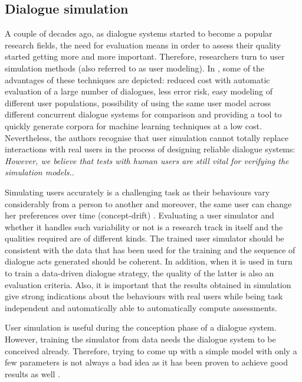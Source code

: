     \subsection{Dialogue simulation}
    
    	A couple of decades ago, as dialogue systems started to become a popular research fields, the need for evaluation means in order to assess their quality started getting more and more important. Therefore, researchers turn to user simulation methods (also referred to as user modeling). In \cite{Eckert1997}, some of the advantages of these techniques are depicted: reduced cost with automatic evaluation of a large number of dialogues, less error risk, easy modeling of different user populations, possibility of using the same user model across different concurrent dialogue systems for comparison and providing a tool to quickly generate corpora for machine learning techniques at a low cost. Nevertheless, the authors recognise that user simulation cannot totally replace interactions with real users in the process of designing reliable dialogue systems: \textit{However, we believe that tests with human users are still vital for verifying the simulation models.}.
        
       	Simulating users accurately is a challenging task as their behaviours vary considerably from a person to another and moreover, the same user can change her preferences over time (concept-drift) \cite{Schatzmann2006}. Evaluating a user simulator and whether it handles such variability or not is a research track in itself \cite{Pietquin2013} and the qualities required are of different kinds. The trained user simulator should be consistent with the data that has been used for the training and the sequence of dialogue acts generated should be coherent. In addition, when it is used in turn to train a data-driven dialogue strategy, the quality of the latter is also an evaluation criteria. Also, it is important that the results obtained in simulation give strong indications about the behaviours with real users while being task independent and automatically able to automatically compute assessments.
        
        User simulation is useful during the conception phase of a dialogue system. However, training the simulator from data needs the dialogue system to be conceived already. Therefore, trying to come up with a simple model with only a few parameters is not always a bad idea as it has been proven to achieve good results as well \cite{Schatzmann2007}.
        
